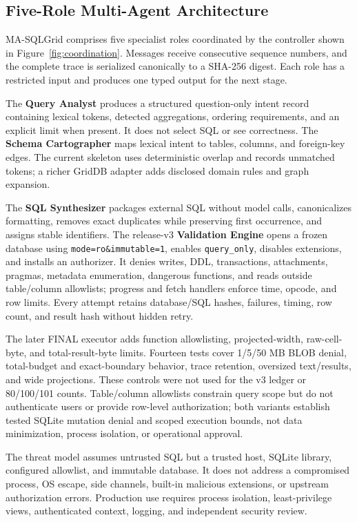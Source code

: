 \documentclass[applsci,article,submit,moreauthors]{Definitions/mdpi}
\newcommand{\masql}{MA-SQLGrid}
\begin{document}
\subsection{Five-Role Multi-Agent Architecture}

\masql{} comprises five specialist roles coordinated by the controller shown in Figure~\ref{fig:coordination}. Messages receive consecutive sequence numbers, and the complete trace is serialized canonically to a SHA-256 digest. Each role has a restricted input and produces one typed output for the next stage.

The \textbf{Query Analyst} produces a structured question-only intent record containing lexical tokens, detected aggregations, ordering requirements, and an explicit limit when present. It does not select SQL or see correctness. The \textbf{Schema Cartographer} maps lexical intent to tables, columns, and foreign-key edges. The current skeleton uses deterministic overlap and records unmatched tokens; a richer GridDB adapter adds disclosed domain rules and graph expansion.

The \textbf{SQL Synthesizer} packages external SQL without model calls, canonicalizes formatting, removes exact duplicates while preserving first occurrence, and assigns stable identifiers. The release-v3 \textbf{Validation Engine} opens a frozen database using \texttt{mode=ro\&immutable=1}, enables \texttt{query\_only}, disables extensions, and installs an authorizer. It denies writes, DDL, transactions, attachments, pragmas, metadata enumeration, dangerous functions, and reads outside table/column allowlists; progress and fetch handlers enforce time, opcode, and row limits. Every attempt retains database/SQL hashes, failures, timing, row count, and result hash without hidden retry.

The later FINAL executor adds function allowlisting, projected-width, raw-cell-byte, and total-result-byte limits. Fourteen tests cover 1/5/50 MB BLOB denial, total-budget and exact-boundary behavior, trace retention, oversized text/results, and wide projections. These controls were not used for the v3 ledger or 80/100/101 counts. Table/column allowlists constrain query scope but do not authenticate users or provide row-level authorization; both variants establish tested SQLite mutation denial and scoped execution bounds, not data minimization, process isolation, or operational approval.

The threat model assumes untrusted SQL but a trusted host, SQLite library, configured allowlist, and immutable database. It does not address a compromised process, OS escape, side channels, built-in malicious extensions, or upstream authorization errors. Production use requires process isolation, least-privilege views, authenticated context, logging, and independent security review.
\end{document}
